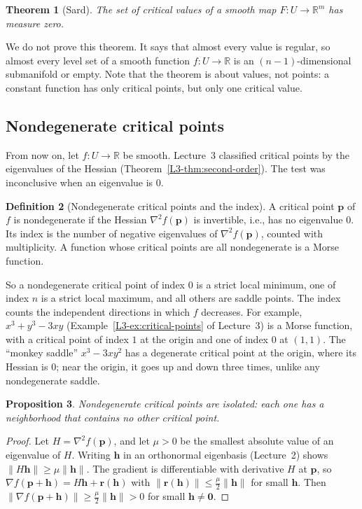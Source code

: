 \documentclass[11pt]{article}
\newcommand{\norm}[1]{\lVert #1 \rVert}
\theoremstyle{definition}
\newtheorem{definition}{Definition}[section]
\theoremstyle{plain}
\newtheorem{theorem}[definition]{Theorem}
\newtheorem{proposition}[definition]{Proposition}
\theoremstyle{remark}
\begin{document}
\begin{theorem}[Sard]\label{thm:sard}
    The set of critical values of a smooth map $F: U \to \mathbb{R}^m$ has measure zero.
\end{theorem}

We do not prove this theorem. It says that almost every value is regular, so almost every level set of a smooth function $f: U \to \mathbb{R}$ is an $(n - 1)$-dimensional submanifold or empty. Note that the theorem is about values, not points: a constant function has only critical points, but only one critical value.

\subsection{Nondegenerate critical points}

From now on, let $f: U \to \mathbb{R}$ be smooth. Lecture~3 classified critical points by the eigenvalues of the Hessian (Theorem~\ref{L3-thm:second-order}). The test was inconclusive when an eigenvalue is $0$.

\begin{definition}[Nondegenerate critical points and the index]\label{def:index}
    A critical point $\mathbf{p}$ of $f$ is nondegenerate if the Hessian $\nabla^2 f(\mathbf{p})$ is invertible, i.e., has no eigenvalue $0$. Its index is the number of negative eigenvalues of $\nabla^2 f(\mathbf{p})$, counted with multiplicity. A function whose critical points are all nondegenerate is a Morse function.
\end{definition}

So a nondegenerate critical point of index $0$ is a strict local minimum, one of index $n$ is a strict local maximum, and all others are saddle points. The index counts the independent directions in which $f$ decreases. For example, $x^3 + y^3 - 3xy$ (Example~\ref{L3-ex:critical-points} of Lecture~3) is a Morse function, with a critical point of index $1$ at the origin and one of index $0$ at $(1, 1)$. The ``monkey saddle'' $x^3 - 3xy^2$ has a degenerate critical point at the origin, where its Hessian is $0$; near the origin, it goes up and down three times, unlike any nondegenerate saddle.

\begin{proposition}\label{prop:isolated}
    Nondegenerate critical points are isolated: each one has a neighborhood that contains no other critical point.
\end{proposition}

\begin{proof}
    Let $H = \nabla^2 f(\mathbf{p})$, and let $\mu > 0$ be the smallest absolute value of an eigenvalue of $H$. Writing $\mathbf{h}$ in an orthonormal eigenbasis (Lecture~2) shows $\norm{H\mathbf{h}} \geq \mu\norm{\mathbf{h}}$. The gradient is differentiable with derivative $H$ at $\mathbf{p}$, so $\nabla f(\mathbf{p} + \mathbf{h}) = H\mathbf{h} + \mathbf{r}(\mathbf{h})$ with $\norm{\mathbf{r}(\mathbf{h})} \leq \frac{\mu}{2}\norm{\mathbf{h}}$ for small $\mathbf{h}$. Then $\norm{\nabla f(\mathbf{p} + \mathbf{h})} \geq \frac{\mu}{2}\norm{\mathbf{h}} > 0$ for small $\mathbf{h} \neq \mathbf{0}$.
\end{proof}
\end{document}
